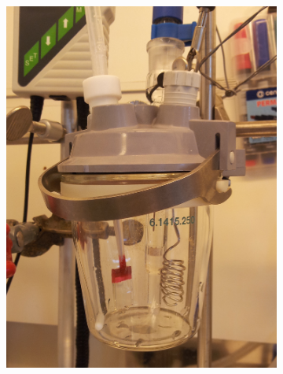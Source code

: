 \documentclass[draft,webedition,openright,titles,swedish,english]{LuaUUThesis}\usepackage[]{graphicx}\usepackage[]{xcolor}
\begin{document}
\begin{figure}[tbp]
\centering
\begin{subfigure}[b]{0.25\linewidth}
   \centering
   \includegraphics[width=\textwidth]{synthesis/electrodeposition/0310114755-cropped.jpg}
   \caption{}
   \label{fig:0301-ED-Autolab02-a}
\end{subfigure}%
\hspace{7pt}%
\begin{subfigure}[b]{0.25\linewidth}
   \centering

\end{subfigure}
\end{figure}
\end{document}
